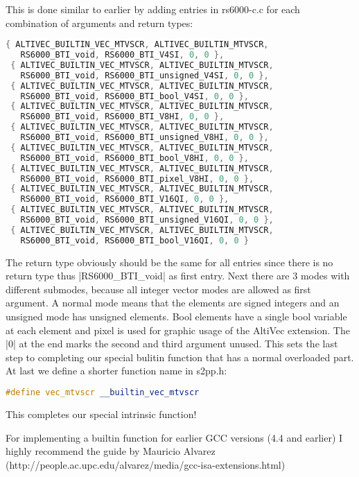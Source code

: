 This is done similar to earlier by adding entries in rs6000-c.c for each combination of arguments and return types:
\begin{lstlisting}[language=C++,basicstyle=\ttfamily\scriptsize,keywordstyle=\color{red}] 
 { ALTIVEC_BUILTIN_VEC_MTVSCR, ALTIVEC_BUILTIN_MTVSCR,
   RS6000_BTI_void, RS6000_BTI_V4SI, 0, 0 },
 { ALTIVEC_BUILTIN_VEC_MTVSCR, ALTIVEC_BUILTIN_MTVSCR,
   RS6000_BTI_void, RS6000_BTI_unsigned_V4SI, 0, 0 },
 { ALTIVEC_BUILTIN_VEC_MTVSCR, ALTIVEC_BUILTIN_MTVSCR,
   RS6000_BTI_void, RS6000_BTI_bool_V4SI, 0, 0 },
 { ALTIVEC_BUILTIN_VEC_MTVSCR, ALTIVEC_BUILTIN_MTVSCR,
   RS6000_BTI_void, RS6000_BTI_V8HI, 0, 0 },
 { ALTIVEC_BUILTIN_VEC_MTVSCR, ALTIVEC_BUILTIN_MTVSCR,
   RS6000_BTI_void, RS6000_BTI_unsigned_V8HI, 0, 0 },
 { ALTIVEC_BUILTIN_VEC_MTVSCR, ALTIVEC_BUILTIN_MTVSCR,
   RS6000_BTI_void, RS6000_BTI_bool_V8HI, 0, 0 },
 { ALTIVEC_BUILTIN_VEC_MTVSCR, ALTIVEC_BUILTIN_MTVSCR,
   RS6000_BTI_void, RS6000_BTI_pixel_V8HI, 0, 0 },
 { ALTIVEC_BUILTIN_VEC_MTVSCR, ALTIVEC_BUILTIN_MTVSCR,
   RS6000_BTI_void, RS6000_BTI_V16QI, 0, 0 },
 { ALTIVEC_BUILTIN_VEC_MTVSCR, ALTIVEC_BUILTIN_MTVSCR,
   RS6000_BTI_void, RS6000_BTI_unsigned_V16QI, 0, 0 },
 { ALTIVEC_BUILTIN_VEC_MTVSCR, ALTIVEC_BUILTIN_MTVSCR,
   RS6000_BTI_void, RS6000_BTI_bool_V16QI, 0, 0 }
\end{lstlisting}
The return type obviously should be the same for all entries since there is no return type thus |RS6000_BTI_void| as first entry. Next there are 3 modes with different submodes, because all integer vector modes are allowed as first argument. A normal mode means that the elements are signed integers and an unsigned mode has unsigned elements. Bool elements have a single bool variable at each element and pixel is used for graphic usage of the AltiVec extension. The |0| at the end marks the second and third argument unused.
This sets the last step to completing our special bulitin function that has a normal overloaded part.
At last we define a shorter function name in s2pp.h:
\begin{lstlisting}[language=C++,basicstyle=\ttfamily\scriptsize,keywordstyle=\color{red}] 
#define vec_mtvscr __builtin_vec_mtvscr
\end{lstlisting}
This completes our special intrinsic function!

For implementing a builtin function for earlier GCC versions (4.4 and earlier) I highly recommend the guide by Mauricio Alvarez (http://people.ac.upc.edu/alvarez/media/gcc-isa-extensions.html) 
